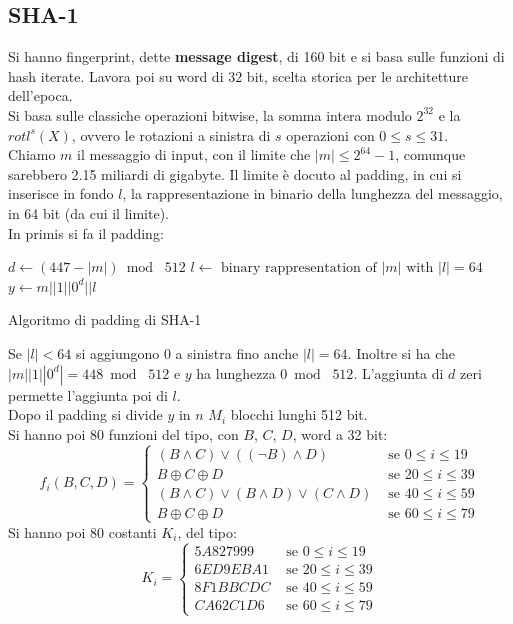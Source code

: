 \documentclass[a4paper,12pt, oneside]{book}
\begin{document}
\subsection{SHA-1}
Si hanno fingerprint, dette \textbf{message digest}, di 160 bit e si basa sulle
funzioni di hash iterate. Lavora poi su word di 32 bit, scelta storica per le
architetture dell'epoca.\\
Si basa sulle classiche operazioni bitwise, la somma intera modulo $2^{32}$ e la
$rotl^s(X)$, ovvero le rotazioni a sinistra di $s$ operazioni con $0\leq s \leq
31$.\\
Chiamo $m$ il messaggio di input, con il limite che $|m|\leq 2^{64}-1$, comunque
sarebbero 2.15 miliardi di gigabyte. Il limite è docuto al padding, in cui si
inserisce in fondo $l$, la rappresentazione in binario della lunghezza del
messaggio, in 64 bit (da cui il limite).\\
In primis si fa il padding:
\begin{algorithm}[H]
  \begin{algorithmic}
    \State $d\gets (447-|m|)\bmod\,\,512$
    \State $l\gets\mbox{ binary rappresentation of }|m|\mbox{ with }|l|=64$
    \State $y\gets m||1||0^d||l$
    \EndFunction
  \end{algorithmic}
  \caption{Algoritmo di padding di SHA-1}
\end{algorithm}
Se $|l|<64$ si aggiungono 0 a sinistra fino anche $|l|=64$.
Inoltre si ha che
$|m||1||0^d|=448\bmod\,\,512$ e $y$ ha lunghezza $0\bmod\,\,512$. L'aggiunta di
$d$ zeri permette l'aggiunta poi di $l$.\\
Dopo il padding si divide $y$ in $n$ $M_i$ blocchi lunghi 512 bit.\\
Si hanno poi 80 funzioni del tipo, con $B$, $C$, $D$, word a 32 bit:
\[f_i(B,C,D)=
  \begin{cases}
    (B\land C)\lor ((\neg B)\land D)&\mbox{ se } 0\leq i\leq 19\\
    B\oplus C\oplus D&\mbox{ se } 20\leq i\leq 39\\
    (B\land C)\lor (B\land D)\lor (C\land D)&\mbox{ se } 40\leq i\leq 59\\
    B\oplus C\oplus D&\mbox{ se } 60\leq i\leq 79
  \end{cases}
\]
Si hanno poi 80 costanti $K_i$, del tipo:
\[K_i=
  \begin{cases}
    5A827999&\mbox{ se } 0\leq i\leq 19\\
    6ED9EBA1&\mbox{ se } 20\leq i\leq 39\\
    8F1BBCDC&\mbox{ se } 40\leq i\leq 59\\
    CA62C1D6&\mbox{ se } 60\leq i\leq 79
  \end{cases}
\]
\end{document}
